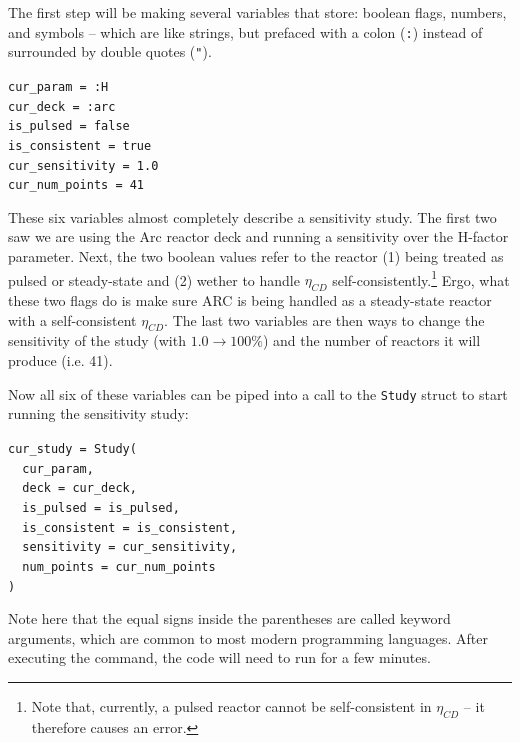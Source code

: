 The first step will be making several variables that store: boolean flags, numbers, and symbols -- which are like strings, but prefaced with a colon (\texttt{:}) instead of surrounded by double quotes (\texttt{"}). 

\begin{addmargin}[1.5em]{1.5em}
\texttt{cur\_param = :H \\
cur\_deck = :arc \\
is\_pulsed = false \\
is\_consistent = true \\
cur\_sensitivity = 1.0 \\
cur\_num\_points = 41
}
\end{addmargin}

These six variables almost completely describe a sensitivity study. The first two saw we are using the Arc reactor deck and running a sensitivity over the H-factor parameter. Next, the two boolean values refer to the reactor (1) being treated as pulsed or steady-state and (2) wether to handle $\eta_{CD}$ self-consistently.\footnote{Note that, currently, a pulsed reactor cannot be self-consistent in $\eta_{CD}$ -- it therefore causes an error.} Ergo, what these two flags do is make sure ARC is being handled as a steady-state reactor with a self-consistent $\eta_{CD}$. The last two variables are then ways to change the sensitivity of the study (with $1.0 \rightarrow 100\%$) and the number of reactors it will produce (i.e. 41).

Now all six of these variables can be piped into a call to the \texttt{Study} struct to start running the sensitivity study:

\begin{addmargin}[1.5em]{1.5em}
\texttt{cur\_study = Study( \\
\-\ \-\ cur\_param, \\
\-\ \-\ deck = cur\_deck, \\
\-\ \-\ is\_pulsed = is\_pulsed, \\
\-\ \-\ is\_consistent = is\_consistent, \\
\-\ \-\ sensitivity = cur\_sensitivity, \\
\-\ \-\ num\_points = cur\_num\_points \\
)
}
\end{addmargin}

Note here that the equal signs inside the parentheses are called keyword arguments, which are common to most modern programming languages. After executing the command, the code will need to run for a few minutes.

